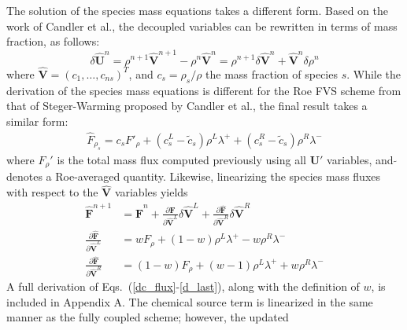 The solution of the species mass equations takes a different form.  Based on the
work of Candler et al.\cite{candler}, the decoupled variables can be rewritten
in terms of mass fraction, as follows:
\begin{equation}
  \delta \mathbf{\hat{U}}^n =
  \rho^{n+1}\mathbf{\hat{V}}^{n+1}-\rho^n\mathbf{\hat{V}}^n = \rho^{n+1} \delta
  \mathbf{\hat{V}}^n + \mathbf{\hat{V}}^n \delta \rho^n 
\end{equation}
where $\mathbf{\hat{V}}=(c_1,\hdots,c_{ns})^T$, and $c_s=\rho_s/\rho$ the mass
fraction of species $s$.  While the derivation of the species mass equations is
different for the Roe FVS scheme from that of Steger-Warming proposed by Candler
et al.\cite{candler}, the final result takes a similar form: 
\begin{gather}
  \hat{F}_{\rho_s} = c_s F'_\rho+(c_s^L-\tilde{c}_s)\rho^L\lambda^+
  + (c_s^R-\tilde{c}_s)\rho^R\lambda^-
  \label{dc_flux}
\end{gather}
where $F_\rho'$ is the total mass flux computed previously using all
$\mathbf{U}'$ variables, and $\tilde{}$ denotes a Roe-averaged quantity.
Likewise, linearizing the species mass fluxes with respect to the
$\mathbf{\hat{V}}$ variables yields
\begin{align} 
  \mathbf{\hat{F}}^{n+1} &= \mathbf{\hat{F}}^n +\frac{\partial
  \mathbf{\hat{F}}}{\partial \mathbf{\hat{V}}^L}\delta \mathbf{\hat{V}}^L
  +\frac{\partial \mathbf{\hat{F}}}{\partial \mathbf{\hat{V}}^R}\delta
  \mathbf{\hat{V}}^R \\ \frac{\partial \mathbf{\hat{F}}}{\partial
  \mathbf{\hat{V}}^L} &= wF_\rho+(1-w)\rho^L\lambda^+ - w\rho^R\lambda^- \\
  \frac{\partial \mathbf{\hat{F}}}{\partial \mathbf{\hat{V}}^R} &=
  (1-w)F_\rho+(w-1)\rho^L\lambda^+ + w\rho^R\lambda^-
  \label{d_last}
\end{align}
A full derivation of Eqs.~(\ref{dc_flux}-\ref{d_last}), along with the
definition of $w$, is included in Appendix A.  The chemical source term is
linearized in the same manner as the fully coupled scheme; however, the updated
